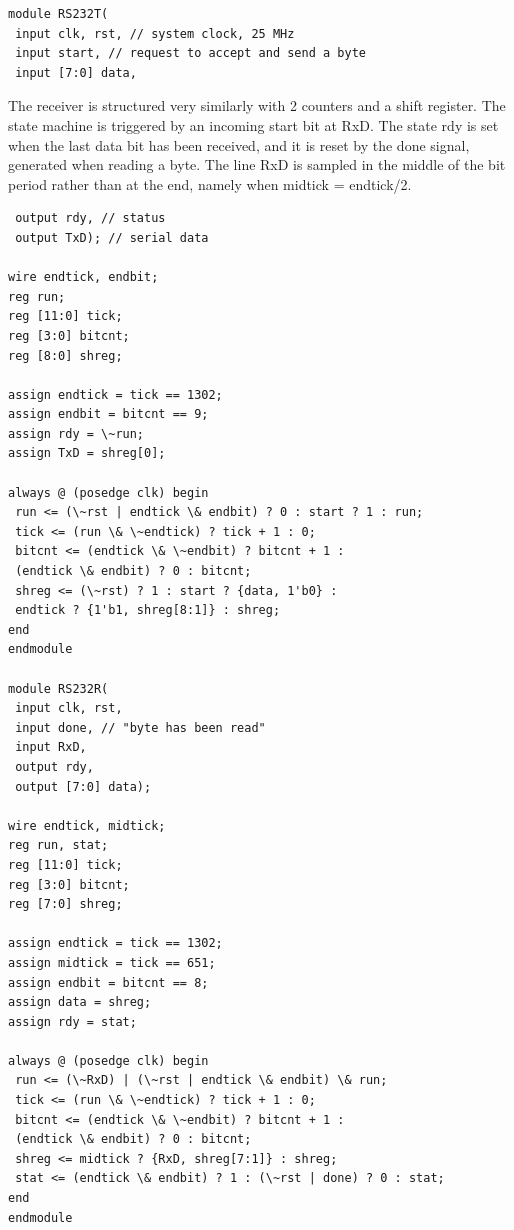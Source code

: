 \begin{verbatim}
module RS232T(
 input clk, rst, // system clock, 25 MHz
 input start, // request to accept and send a byte
 input [7:0] data,
\end{verbatim}

The receiver is structured very similarly with 2 counters and a shift register. The state machine is
triggered by an incoming start bit at RxD. The state rdy is set when the last data bit has been
received, and it is reset by the done signal, generated when reading a byte. The line RxD is
sampled in the middle of the bit period rather than at the end, namely when midtick = endtick/2.
\begin{verbatim}
 output rdy, // status
 output TxD); // serial data

wire endtick, endbit;
reg run;
reg [11:0] tick;
reg [3:0] bitcnt;
reg [8:0] shreg;

assign endtick = tick == 1302;
assign endbit = bitcnt == 9;
assign rdy = \~run;
assign TxD = shreg[0];

always @ (posedge clk) begin
 run <= (\~rst | endtick \& endbit) ? 0 : start ? 1 : run;
 tick <= (run \& \~endtick) ? tick + 1 : 0;
 bitcnt <= (endtick \& \~endbit) ? bitcnt + 1 :
 (endtick \& endbit) ? 0 : bitcnt;
 shreg <= (\~rst) ? 1 : start ? {data, 1'b0} :
 endtick ? {1'b1, shreg[8:1]} : shreg;
end
endmodule

module RS232R(
 input clk, rst,
 input done, // "byte has been read"
 input RxD,
 output rdy,
 output [7:0] data);

wire endtick, midtick;
reg run, stat;
reg [11:0] tick;
reg [3:0] bitcnt;
reg [7:0] shreg;

assign endtick = tick == 1302;
assign midtick = tick == 651;
assign endbit = bitcnt == 8;
assign data = shreg;
assign rdy = stat;

always @ (posedge clk) begin
 run <= (\~RxD) | (\~rst | endtick \& endbit) \& run;
 tick <= (run \& \~endtick) ? tick + 1 : 0;
 bitcnt <= (endtick \& \~endbit) ? bitcnt + 1 :
 (endtick \& endbit) ? 0 : bitcnt;
 shreg <= midtick ? {RxD, shreg[7:1]} : shreg;
 stat <= (endtick \& endbit) ? 1 : (\~rst | done) ? 0 : stat;
end
endmodule
\end{verbatim}
